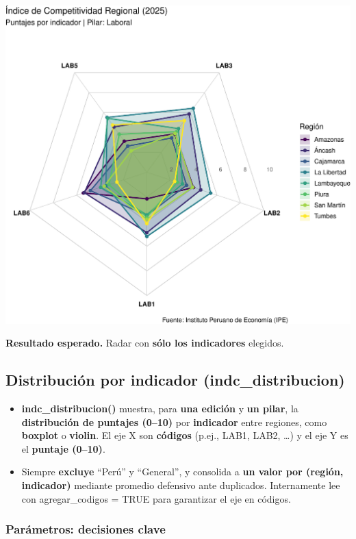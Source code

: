 \documentclass[
  11pt,
  letterpaper,
  DIV=11,
  numbers=noendperiod]{scrartcl}
\begin{document}
\includegraphics{Manual_files/figure-pdf/unnamed-chunk-96-1.pdf}

\textbf{Resultado esperado.} Radar con \textbf{sólo los indicadores}
elegidos.

\subsection{\texorpdfstring{\textbf{Distribución por indicador
(indc\_distribucion)}}{Distribución por indicador (indc\_distribucion)}}\label{distribuciuxf3n-por-indicador-indc_distribucion-1}

\begin{itemize}
\item
  \textbf{indc\_distribucion()} muestra, para \textbf{una edición} y
  \textbf{un pilar}, la \textbf{distribución de puntajes (0--10)} por
  \textbf{indicador} entre regiones, como \textbf{boxplot} o
  \textbf{violin}. El eje X son \textbf{códigos} (p.ej., LAB1, LAB2,
  \ldots) y el eje Y es el \textbf{puntaje (0--10)}.
\item
  Siempre \textbf{excluye} ``Perú'' y ``General'', y consolida a
  \textbf{un valor por (región, indicador)} mediante promedio defensivo
  ante duplicados. Internamente lee con agregar\_codigos = TRUE para
  garantizar el eje en códigos.
\end{itemize}

\subsubsection{\texorpdfstring{\textbf{Parámetros: decisiones
clave}}{Parámetros: decisiones clave}}\label{paruxe1metros-decisiones-clave-4}
\end{document}
